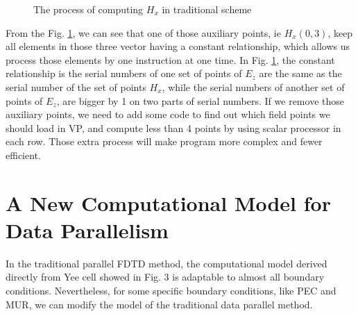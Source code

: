 \begin{figure}[hbtp]
\centering
\def \yshift {-1}
\def \xshift {1}
\caption{The process of computing $H_x$ in traditional scheme}
\label{ch3 fig:cmp}
\end{figure}

From the Fig. \ref{ch3 fig:cmp}, we can see that one of those auxiliary points, ie $H_x(0,3)$, keep all elements in those three vector having a constant relationship, which allows us process those elements by one instruction at one time. In Fig. \ref{ch3 fig:cmp}, the constant relationship is the serial numbers of one set of points of $E_z$ are the same as the serial number of the set of points $H_x$, while the serial numbers of another set of points of $E_z$, are bigger by 1 on two parts of serial numbers. If we remove those auxiliary points, we need to add some code to find out which field points we should load in VP, and compute less than 4 points by using scalar processor in each row. Those extra process will make program more complex and fewer efficient.

\section{A New Computational Model for Data Parallelism}

In the traditional parallel FDTD method, the computational model derived directly from Yee cell showed in Fig. 3 is adaptable to almost all boundary conditions. Nevertheless, for some specific boundary conditions, like PEC and MUR, we can modify the model of the traditional data parallel method. 

